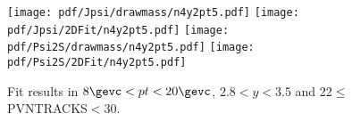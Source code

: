 \begin{figure}[H]
\begin{center}
\texttt{[image: pdf/Jpsi/drawmass/n4y2pt5.pdf]}
\texttt{[image: pdf/Jpsi/2DFit/n4y2pt5.pdf]}
\vspace*{-0.5cm}
\texttt{[image: pdf/Psi2S/drawmass/n4y2pt5.pdf]}
\texttt{[image: pdf/Psi2S/2DFit/n4y2pt5.pdf]}
\vspace*{-0.5cm}
\end{center}
\caption{Fit results in $8\gevc<pt<20\gevc$, $2.8<y<3.5$ and 22$\leq$PVNTRACKS$<$30.}
\label{Fitn4y2pt5}
\end{figure}
